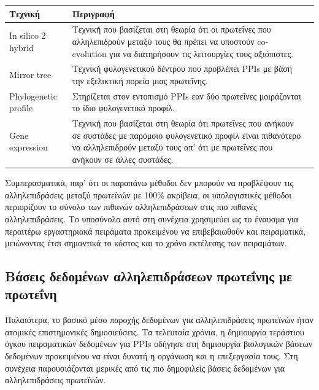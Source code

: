 \begingroup
    \begin{tabularx}{0.8\textwidth} { 
      | >{\raggedright\arraybackslash}X 
      | >{\centering\arraybackslash}X 
      | >{\raggedleft\arraybackslash}X | }
     \hline
     \textbf{Τεχνική} & \textbf{Περιγραφή}\\
     \hline
     In silico 2 hybrid & Τεχνική που βασίζεται στη θεωρία ότι οι πρωτεΐνες που αλληλεπιδρούν μεταξύ τους θα πρέπει να υποστούν co-evolution για να διατηρήσουν τις λειτουργίες τους αξιόπιστες. \\
     \hline
     Mirror tree & Τεχνική φυλογενετικού δέντρου που προβλέπει PPIs με βάση την εξελικτική πορεία μιας πρωτεΐνης. \\
     \hline
     Phylogenetic profile & Στηρίζεται στον εντοπισμό PPIs εαν δύο πρωτεΐνες μοιράζονται το ίδιο φυλογενετικό προφίλ. \\
     \hline
     Gene expression & Τεχνική που βασίζεται στη θεωρία ότι πρωτεΐνες που ανήκουν σε συστάδες με παρόμοιο φυλογενετικό προφίλ είναι πιθανότερο να αλληλεπιδρούν μεταξύ τους απ' ότι με πρωτεΐνες που ανήκουν σε άλλες συστάδες. \\
     \hline
    \end{tabularx}
 \label{In Silico τεχνικές εντοπισμού PPIs}
\endgroup

\medskip
Συμπερασματικά, παρ' ότι οι παραπάνω μέθοδοι δεν μπορούν να προβλέψουν τις αλληλεπιδράσεις μεταξύ πρωτεϊνών με 100\% ακρίβεια, οι υπολογιστικές μέθοδοι περιορίζουν το σύνολο των πιθανών αλληλεπιδράσεων στις πιο πιθανές αλληλεπιδράσεις. Το υποσύνολο αυτό στη συνέχεια χρησιμεύει ως το έναυσμα για περαιτέρω εργαστηριακά πειράματα προκειμένου να επιβεβαιωθούν και πειραματικά, μειώνοντας έτσι σημαντικά το κόστος και το χρόνο εκτέλεσης των πειραμάτων.



\subsection{Βάσεις δεδομένων αλληλεπιδράσεων πρωτεΐνης με πρωτεΐνη}

Παλαιότερα, το βασικό μέσο παροχής δεδομένων για αλληλεπιδράσεις πρωτεϊνών ήταν ατομικές επιστημονικές δημοσιεύσεις. Τα τελευταία χρόνια, η δημιουργία τεράστιου όγκου πειραματικών δεδομένων για PPIs οδήγησε στη δημιουργία βιολογικών βάσεων δεδομένων προκειμένου να είναι δυνατή η οργάνωση και η επεξεργασία τους. Στη συνέχεια παρουσιάζονται μερικές από τις πιο δημοφιλείς βάσεις δεδομένων για αλληλεπιδράσεις πρωτεϊνών.

